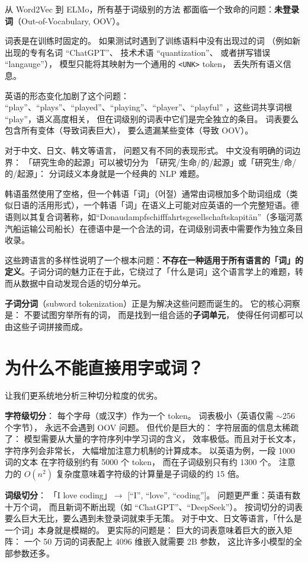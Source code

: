 从 Word2Vec 到 ELMo，所有基于词级别的方法
都面临一个致命的问题：\textbf{未登录词}（Out-of-Vocabulary, OOV）。

词表是在训练时固定的。
如果测试时遇到了训练语料中没有出现过的词
（例如新出现的专有名词 “ChatGPT”、
技术术语 “quantization”、
或者拼写错误 “langauge”），
模型只能将其映射为一个通用的 \texttt{<UNK>} token，
丢失所有语义信息。

英语的形态变化加剧了这个问题：
“play”、“plays”、“played”、“playing”、“player”、“playful”
，这些词共享词根 “play”，语义高度相关，
但在词级别的词表中它们是完全独立的条目。
词表要么包含所有变体（导致词表巨大），
要么遗漏某些变体（导致 OOV）。

对于中文、日文、韩文等语言，
问题又有不同的表现形式。
中文没有明确的词边界：
「研究生命的起源」可以被切分为
「研究/生命/的/起源」或「研究生/命/的/起源」：
分词歧义本身就是一个经典的 NLP 难题。

韩语虽然使用了空格，但一个韩语「词」（어절）通常由词根加多个助词组成（类似日语的活用形式），一个韩语「词」在语义上可能对应英语的一个完整短语。德语则以其复合词著称，如“Donaudampfschifffahrtsgesellschaftskapitän”（多瑙河蒸汽船运输公司船长）在德语中是一个合法的词，在词级别词表中需要作为独立条目收录。

这些跨语言的多样性说明了一个根本问题：\textbf{不存在一种适用于所有语言的「词」的定义}。子词分词的魅力正在于此，它绕过了「什么是词」这个语言学上的难题，转而从数据中自动发现合适的切分单元。

\textbf{子词分词}（subword tokenization）正是为解决这些问题而诞生的。
它的核心洞察是：
不要试图穷举所有的词，
而是找到一组合适的\textbf{子词单元}，
使得任何词都可以由这些子词拼接而成。

\section{为什么不能直接用字或词？}

让我们更系统地分析三种切分粒度的优劣。

\textbf{字符级切分}：
每个字母（或汉字）作为一个 token。
词表极小（英语仅需 $\sim$256 个字节），
永远不会遇到 OOV 问题。
但代价是巨大的：
字符层面的信息太稀疏了：
模型需要从大量的字符序列中学习词的含义，
效率极低。而且对于长文本，字符序列会非常长，
大幅增加注意力机制的计算成本。
以英语为例，一段 1000 词的文本
在字符级别约有 5000 个 token，
而在子词级别只有约 1300 个。
注意力的 $O(n^2)$ 复杂度意味着字符级的计算量是子词级的约 15 倍。

\textbf{词级切分}：
「I love coding」$\to$ [“I”, “love”, “coding”]。
问题更严重：英语有数十万个词，
而且新词不断出现（如 “ChatGPT”、“DeepSeek”）。
按词切分的词表要么巨大无比，要么遇到未登录词就束手无策。
对于中文、日文等语言，「什么是一个词」本身就是模糊的。
更实际的问题是：
巨大的词表意味着巨大的嵌入矩阵：
一个 50 万词的词表配上 4096 维嵌入就需要 2B 参数，
这比许多小模型的全部参数还多。

